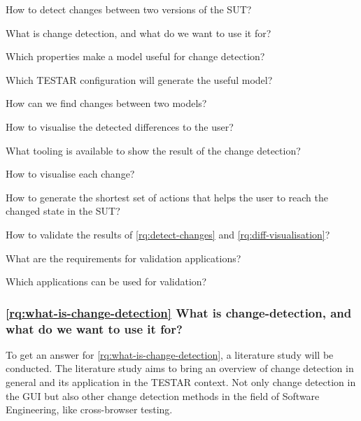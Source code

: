 \begin{questions}
    \item How to detect changes between two versions of the SUT? \label{rq:detect-changes}
    \begin{questions}
        \item What is change detection, and what do we want to use it for? \label{rq:what-is-change-detection}
        \item Which properties make a model useful for change detection? \label{rq:useful-detection}
        \item Which TESTAR configuration will generate the useful model? \label{rq:TESTAR-config}
        \item How can we find changes between two models? \label{rq:finding-changes}
    \end{questions}

    \item How to visualise the detected differences to the user? \label{rq:diff-visualisation}
    \begin{questions}
        \item What tooling is available to show the result of the change detection? \label{rq:tooling}
        \item How to visualise each change? \label{rq:type-visualisation}
        \item How to generate the shortest set of actions that helps the user to reach the changed state in the SUT? \label{rq:shortest-set}    
    \end{questions}
    
    \item How to validate the results of \ref{rq:detect-changes} and \ref{rq:diff-visualisation}? \label{rq:validation}
    \begin{questions}
        \item What are the requirements for validation applications? \label{rq:req-apps}
        \item Which applications can be used for validation? \label{rq:validation-apps}
    \end{questions}
\end{questions}

\subsubsection{\ref{rq:what-is-change-detection} What is change-detection, and what do we want to use it for?}
To get an answer for \ref{rq:what-is-change-detection}, a literature study will be conducted. The literature study aims to bring an overview of change detection in general and its application in the TESTAR context. Not only change detection in the GUI but also other change detection methods in the field of Software Engineering, like cross-browser testing. 

